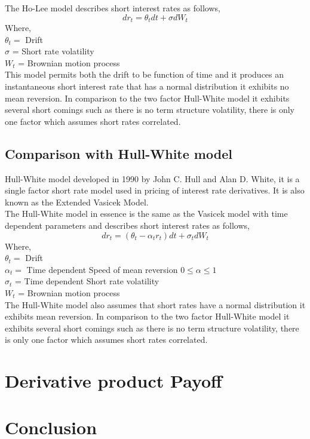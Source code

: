 \documentclass{article}
\begin{document}
The Ho-Lee  model describes short interest rates as follows,
 \[
dr_t = \theta_t dt + \sigma  dW_t
\]
Where,\\
$\theta_t =$ Drift  \\
$\sigma$ = Short rate volatility \\
$W_t$ = Brownian motion process  \\

This model permits both the drift to be function of time and it produces an instantaneous short interest rate that has a normal distribution it exhibits no mean reversion.  In comparison to the two factor Hull-White model it exhibits several short comings such as there is no term structure volatility, there is only one factor which assumes short rates correlated.

\subsection{Comparison with Hull-White model
}
Hull-White model developed in 1990 \cite{HW1} by John C. Hull and Alan D. White, it is a single factor short rate model used in pricing of interest rate derivatives.  It is also known as the Extended Vasicek Model.\\

The Hull-White model in essence is the same as the Vasicek model with time dependent parameters and describes short interest rates as follows,
 \[
dr_t = (\theta_t - \alpha_t r_t) dt + \sigma_t  dW_t
\]
Where,\\
$\theta_t =$ Drift  \\
$\alpha_t =$ Time dependent Speed of mean reversion $0 \leq \alpha \leq 1 $ \\
$\sigma_t$ = Time dependent Short rate volatility \\
$W_t$ = Brownian motion process  \\

The Hull-White model also assumes that short rates have a normal distribution it exhibits mean reversion.  In comparison to the two factor Hull-White model it exhibits several short comings such as there is no term structure volatility, there is only one factor which assumes short rates correlated.
\section{Derivative product Payoff}


\section{Conclusion}
\end{document}
